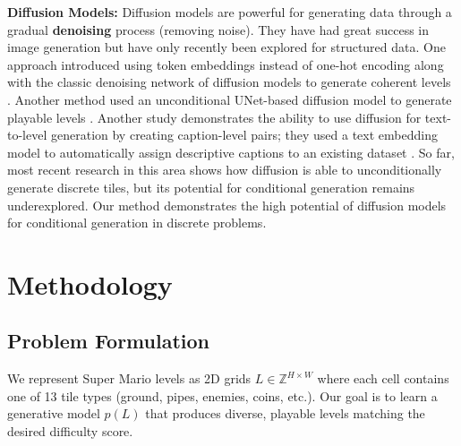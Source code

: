 \documentclass[conference]{IEEEtran}
\begin{document}
\textbf{Diffusion Models:} Diffusion models are powerful for generating data through a gradual \textbf{denoising} process (removing noise). They have had great success in image generation but have only recently been explored for structured data. One approach introduced using token embeddings instead of one-hot encoding along with the classic denoising network of diffusion models to generate coherent levels \cite{dai2024diffusionpcg}. Another method used an unconditional UNet-based diffusion model to generate playable levels \cite{lee2024diffusionpcg}. Another study demonstrates the ability to use diffusion for text-to-level generation by creating caption-level pairs; they used a text embedding model to automatically assign descriptive captions to an existing dataset \cite{schrum2025texttolevel}. So far, most recent research in this area shows how diffusion is able to unconditionally generate discrete tiles, but its potential for conditional generation remains underexplored. Our method demonstrates the high potential of diffusion models for conditional generation in discrete problems.
\section{Methodology}
\subsection{Problem Formulation}
We represent Super Mario levels as 2D grids $L \in \mathbb{Z}^{H \times W}$ where each cell contains one of 13 tile types (ground, pipes, enemies, coins, etc.). Our goal is to learn a generative model $p(L)$ that produces diverse, playable levels matching the desired difficulty score.
\end{document}
